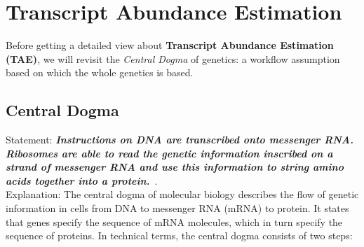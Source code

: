 \section{Transcript Abundance Estimation}
Before getting a detailed view about \textbf{Transcript Abundance Estimation (TAE)}, we will revisit the \textit{Central Dogma} of genetics: a workflow assumption based on which the whole genetics is based.
\subsection{Central Dogma}
Statement: \textit{\textbf{Instructions on DNA are transcribed onto messenger RNA. Ribosomes are able to read the genetic information inscribed on a strand of messenger RNA and use this information to string amino acids together into a protein.}}~\cite{cdogma2017}.\\
Explanation: The central dogma of molecular biology describes the flow of genetic information in cells from DNA to messenger RNA (mRNA) to protein.  It states that genes specify the sequence of mRNA molecules, which in turn specify the sequence of proteins. In technical terms, the central dogma consists of two steps:\\

